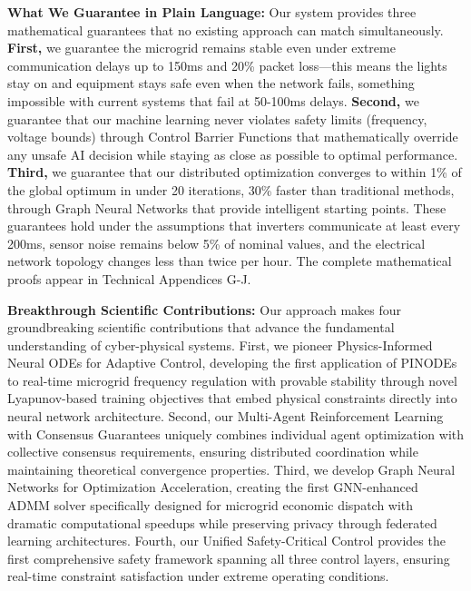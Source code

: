 \documentclass[12pt]{article}
\begin{document}
\textbf{What We Guarantee in Plain Language:} Our system provides three mathematical guarantees that no existing approach can match simultaneously. \textbf{First,} we guarantee the microgrid remains stable even under extreme communication delays up to 150ms and 20\% packet loss---this means the lights stay on and equipment stays safe even when the network fails, something impossible with current systems that fail at 50-100ms delays. \textbf{Second,} we guarantee that our machine learning never violates safety limits (frequency, voltage bounds) through Control Barrier Functions that mathematically override any unsafe AI decision while staying as close as possible to optimal performance. \textbf{Third,} we guarantee that our distributed optimization converges to within 1\% of the global optimum in under 20 iterations, 30\% faster than traditional methods, through Graph Neural Networks that provide intelligent starting points. These guarantees hold under the assumptions that inverters communicate at least every 200ms, sensor noise remains below 5\% of nominal values, and the electrical network topology changes less than twice per hour. The complete mathematical proofs appear in Technical Appendices G-J.

\textbf{Breakthrough Scientific Contributions:} Our approach makes four groundbreaking scientific contributions that advance the fundamental understanding of cyber-physical systems. First, we pioneer Physics-Informed Neural ODEs for Adaptive Control, developing the first application of PINODEs to real-time microgrid frequency regulation with provable stability through novel Lyapunov-based training objectives that embed physical constraints directly into neural network architecture. Second, our Multi-Agent Reinforcement Learning with Consensus Guarantees uniquely combines individual agent optimization with collective consensus requirements, ensuring distributed coordination while maintaining theoretical convergence properties. Third, we develop Graph Neural Networks for Optimization Acceleration, creating the first GNN-enhanced ADMM solver specifically designed for microgrid economic dispatch with dramatic computational speedups while preserving privacy through federated learning architectures. Fourth, our Unified Safety-Critical Control provides the first comprehensive safety framework spanning all three control layers, ensuring real-time constraint satisfaction under extreme operating conditions.
\end{document}
